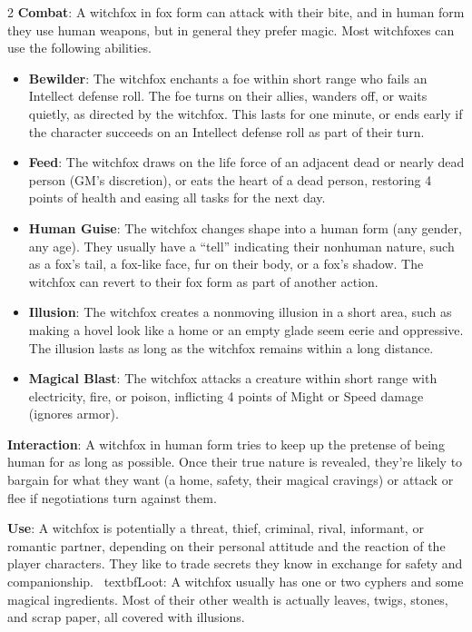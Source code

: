 \begin{multicols}{2}
\textbf{Combat}: A witchfox in fox form can attack with their bite, and in human form they use human weapons, but in general they prefer magic. Most witchfoxes can use the following abilities. 
\begin{itemize}

\item \textbf{Bewilder}: The witchfox enchants a foe within short range who fails an Intellect defense roll. The foe turns on their allies, wanders off, or waits quietly, as directed by the witchfox. This lasts for one minute, or ends early if the character succeeds on an Intellect defense roll as part of their turn. 

\item \textbf{Feed}: The witchfox draws on the life force of an adjacent dead or nearly dead person (GM’s discretion), or eats the heart of a dead person, restoring 4 points of health and easing all tasks for the next day. 

\item \textbf{Human Guise}: The witchfox changes shape into a human form (any gender, any age). They usually have a “tell” indicating their nonhuman nature, such as a fox’s tail, a fox-like face, fur on their body, or a fox’s shadow. The witchfox can revert to their fox form as part of another action.

\item \textbf{Illusion}: The witchfox creates a nonmoving illusion in a short area, such as making a hovel look like a home or an empty glade seem eerie and oppressive. The illusion lasts as long as the witchfox remains within a long distance. 

\item \textbf{Magical Blast}: The witchfox attacks a creature within short range with electricity, fire, or poison, inflicting 4 points of Might or Speed damage (ignores armor). 
\end{itemize}

\textbf{Interaction}: A witchfox in human form tries to keep up the pretense of being human for as long as possible. Once their true nature is revealed, they’re likely to bargain for what they want (a home, safety, their magical cravings) or attack or flee if negotiations turn against them. 

\textbf{Use}: A witchfox is potentially a threat, thief, criminal, rival, informant, or romantic partner, depending on their personal attitude and the reaction of the player characters. They like to trade secrets they know in exchange for safety and companionship. 
\
textbf{Loot}: A witchfox usually has one or two cyphers and some magical ingredients. Most of their other wealth is actually leaves, twigs, stones, and scrap paper, all covered with illusions.


\end{multicols}
